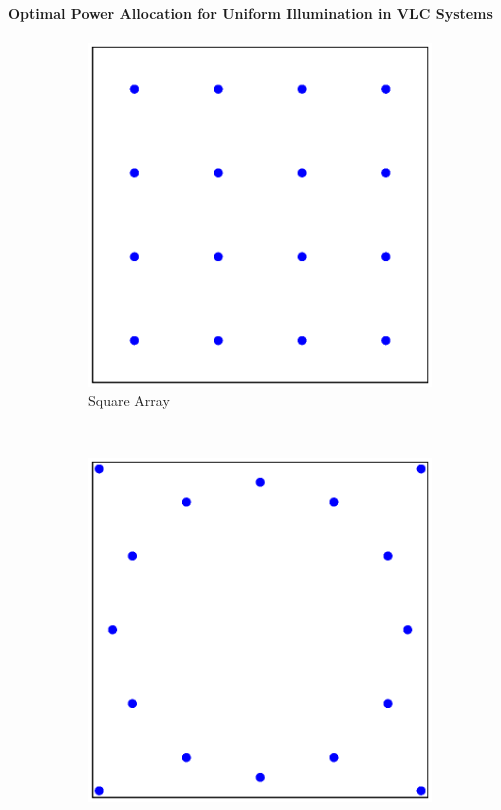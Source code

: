 \documentclass{beamer}
\theoremstyle{remark}
\begin{document}
\begin{frame}
\frametitle{\,}
\framesubtitle{Optimal Power Allocation for Uniform Illumination in VLC Systems}

\begin{figure}
\centering
\begin{subfigure}{0.33\columnwidth}
\includegraphics[width=\columnwidth]{c4_deploy_sq}
\caption{Square Array }
\end{subfigure}~
\begin{subfigure}{0.33\columnwidth}
\includegraphics[width=\columnwidth]{c4_deploy_cirsq}

\end{subfigure}
\end{figure}
\end{frame}
\end{document}
